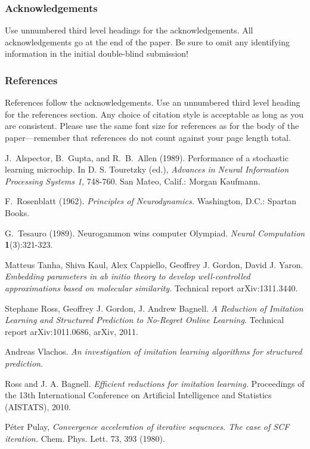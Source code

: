 \documentclass[twoside]{article}
\begin{document}
\subsubsection*{Acknowledgements}

Use unnumbered third level headings for the acknowledgements.  All
acknowledgements go at the end of the paper.  Be sure to omit any
identifying information in the initial double-blind submission!


\subsubsection*{References}

References follow the acknowledgements.  Use an unnumbered third level
heading for the references section.  Any choice of citation style is
acceptable as long as you are consistent.  Please use the same font
size for references as for the body of the paper---remember that
references do not count against your page length total.

J.~Alspector, B.~Gupta, and R.~B.~Allen (1989). Performance of a
stochastic learning microchip.  In D. S. Touretzky (ed.), {\it
  Advances in Neural Information Processing Systems 1}, 748-760.  San
Mateo, Calif.: Morgan Kaufmann.

F.~Rosenblatt (1962). {\it Principles of Neurodynamics.} Washington,
D.C.: Spartan Books.

G.~Tesauro (1989). Neurogammon wins computer Olympiad.  {\it Neural
  Computation} {\bf 1}(3):321-323.

\begin{thebibliography}{9}
  Matteus Tanha, Shiva Kaul, Alex Cappiello, Geoffrey J. Gordon, David J. Yaron.
  \emph{Embedding parameters in ab initio theory to develop well-controlled approximations based on molecular similarity}.
  Technical report arXiv:1311.3440.
  
  Stephane Ross, Geoffrey J. Gordon, J. Andrew Bagnell.
  \emph{A Reduction of Imitation Learning and Structured Prediction to No-Regret Online Learning}.
  Technical report arXiv:1011.0686, arXiv, 2011.
  
  Andreas Vlachos.
  \emph{An investigation of imitation learning algorithms for structured prediction}.
  
    Ross and J. A. Bagnell.
  \emph{Efficient reductions for imitation
learning.} Proceedings of the 13th International
Conference on Artificial Intelligence and Statistics (AISTATS),
2010.

   Péter Pulay,
  \emph{Convergence acceleration of iterative sequences. The case of SCF iteration.} Chem. Phys. Lett. 73, 393 (1980).

\end{thebibliography}
\end{document}
